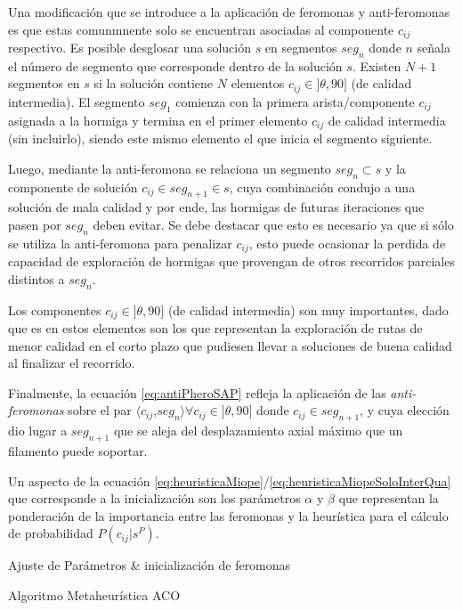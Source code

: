 \begin{itemize}
    
    Una modificaci\'on que se introduce a la aplicaci\'on de  feromonas y anti-feromonas es que estas comunmnente solo se encuentran asociadas al componente $c_{ij}$ respectivo. Es posible desglosar una soluci\'on $s$ en segmentos $seg_{n}$ donde $n$ se\~nala el n\'umero de segmento que corresponde dentro de la soluci\'on $s$. Existen $N + 1$ segmentos en $s$ si la soluci\'on contiene $N$ elementos $c_{ij} \in ]\theta, 90]$ (de calidad intermedia). El segmento $seg_1$ comienza con la primera arista/componente $c_{ij}$ asignada a la hormiga y termina en el primer elemento $c_{ij}$ de calidad intermedia (sin incluirlo), siendo este mismo elemento el que inicia el segmento siguiente.
    
    
    Luego, mediante la anti-feromona se relaciona un segmento $seg_n \subset s$ y la componente de soluci\'on $c_{ij} \in seg_{n+1} \in s$, cuya combinaci\'on condujo a una soluci\'on de mala calidad y por ende, las hormigas de futuras iteraciones que pasen por $seg_n$ deben evitar. Se debe destacar que esto es necesario ya que si s\'olo se utiliza la anti-feromona para penalizar $c_{ij}$, esto puede ocasionar la perdida de capacidad de exploraci\'on de hormigas que provengan de otros recorridos parciales distintos a $seg_n$. 
    

    Los componentes $c_{ij} \in ]\theta, 90]$ (de calidad intermedia) son muy importantes, dado que es en estos elementos son los que representan la exploraci\'on de rutas de menor calidad en el corto plazo que pudiesen llevar a soluciones de buena calidad al finalizar el recorrido.
    
    
    Finalmente, la ecuaci\'on \ref{eq:antiPheroSAP} refleja la aplicaci\'on de las {\it anti-feromonas} sobre el par $\langle c_{ij}$,$ seg_{n}\rangle \forall c_{ij} \in ]\theta, 90]$  donde $c_{ij} \in seg_{n+1}$, y cuya elecci\'on dio lugar a $seg_{n+1}$ que se aleja del desplazamiento axial m\'aximo que un filamento puede soportar.
    
\end{itemize}



Un aspecto de la ecuaci\'on \ref{eq:heuristicaMiope}/\ref{eq:heuristicaMiopeSoloInterQua} que corresponde a la inicializaci\'on son los par\'ametros $\alpha$ y $\beta$ que representan la ponderaci\'on de la importancia entre las feromonas y la heur\'istica para el c\'alculo de probabilidad $P(c_{ij} | s^{P})$. 


\begin{algorithm}[H]
\SetAlgoLined
{}
 Ajuste de Par\'ametros \& inicializaci\'on de feromonas \;
 \caption{Algoritmo Metaheur\'istica ACO}\label{ACO-Algo}
\end{algorithm}

